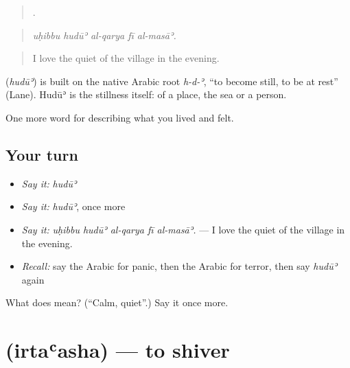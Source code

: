 \begin{quote}
    .
\end{quote}

\begin{quote}
\emph{uḥibbu hudūʾ al-qarya fī al-masāʾ.}
\end{quote}

\begin{quote}
I love the quiet of the village in the evening.
\end{quote}

\begin{cousinweb}
\textbf{} (\emph{hudūʾ}) is built on the native Arabic root \emph{h-d-ʾ}, \textquotedblleft{}to become still, to be at rest\textquotedblright{} (Lane). Hudūʾ is the stillness itself: of a place, the sea or a person.
\end{cousinweb}

\begin{grammarlens}[title={What you've built}]
One more word for describing what you lived and felt.
\end{grammarlens}

\subsection*{Your turn}
\begin{itemize}
\raggedright
  \item \emph{Say it:} \emph{hudūʾ}
  \item \emph{Say it:} \emph{hudūʾ}, once more
  \item \emph{Say it:} \emph{uḥibbu hudūʾ al-qarya fī al-masāʾ.} — I love the quiet of the village in the evening.
  \item \emph{Recall:} say the Arabic for panic, then the Arabic for terror, then say \emph{hudūʾ} again
\end{itemize}

\begin{tcolorbox}[breakable,colback=teal!4,colframe=teal!35!black,title={Before you move on}]
What does  mean? (\textquotedblleft{}Calm, quiet\textquotedblright{}.) Say it once more.
\end{tcolorbox}
\section[\texorpdfstring{\ar{ارتعش} (irtaʿasha)}{ارتعش (irtaʿasha)}]{ (irtaʿasha) — to shiver}

